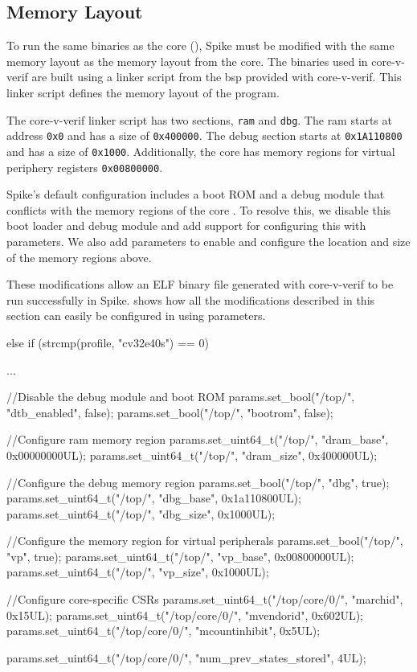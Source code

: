 \subsection{Memory Layout}%

To run the same binaries as the core (), Spike must be modified with the same memory layout as the memory layout from the core.
The binaries used in core-v-verif are built using a linker script from the \acrfull{bsp} provided with core-v-verif. This linker script defines the memory layout of the program.


The core-v-verif linker script \cite{openhwgroupBoardSupportPackage} has two sections, \lstinline{ram} and \lstinline{dbg}. The ram starts at address \lstinline{0x0} and has a size of \lstinline{0x400000}. The debug section starts at \lstinline{0x1A110800} and has a size of \lstinline{0x1000}. Additionally, the core has memory regions for virtual periphery registers  \lstinline{0x00800000}.


Spike's default configuration includes a boot ROM and a debug module that conflicts with the memory regions of the core \cite{evancoxAddDocumentationLowlevel2017}. To resolve this, we disable this boot loader and debug module and add support for configuring this with parameters. We also add parameters to enable and configure the location and size of the memory regions above.

These modifications allow an ELF binary file generated with core-v-verif to be run successfully in Spike. 
 shows how all the modifications described in this section can easily be configured in  using parameters.

\begin{clisting}[caption=Code in \ccode{spike_set_default_params(profile)} configuring Spike for the CV32E40S core.,label=lst:config]
else if (strcmp(profile, "cv32e40s") == 0)
  {
    ...

    //Disable the debug module and boot ROM
    params.set_bool("/top/", "dtb_enabled", false);
    params.set_bool("/top/", "bootrom", false);

    //Configure ram memory region
    params.set_uint64_t("/top/", "dram_base", 0x00000000UL);
    params.set_uint64_t("/top/", "dram_size", 0x400000UL);

    //Configure the debug memory region
    params.set_bool("/top/", "dbg", true);
    params.set_uint64_t("/top/", "dbg_base", 0x1a110800UL);
    params.set_uint64_t("/top/", "dbg_size", 0x1000UL);

    //Configure the memory region for virtual peripherals
    params.set_bool("/top/", "vp", true);
    params.set_uint64_t("/top/", "vp_base", 0x00800000UL);
    params.set_uint64_t("/top/", "vp_size", 0x1000UL);

    //Configure core-specific CSRs
    params.set_uint64_t("/top/core/0/", "marchid", 0x15UL);
    params.set_uint64_t("/top/core/0/", "mvendorid", 0x602UL);
    params.set_uint64_t("/top/core/0/", "mcountinhibit", 0x5UL);

    params.set_uint64_t("/top/core/0/", "num_prev_states_stored", 4UL);
  } 
\end{clisting}

